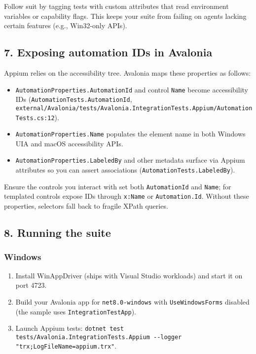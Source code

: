 Follow suit by tagging tests with custom attributes that read
environment variables or capability flags. This keeps your suite from
failing on agents lacking certain features (e.g., Win32-only APIs).

\subsection{7. Exposing automation IDs in
Avalonia}\label{exposing-automation-ids-in-avalonia}

Appium relies on the accessibility tree. Avalonia maps these properties
as follows:

\begin{itemize}
\tightlist
\item
  \passthrough{\lstinline!AutomationProperties.AutomationId!} and
  control \passthrough{\lstinline!Name!} become accessibility IDs
  (\passthrough{\lstinline!AutomationTests.AutomationId!},
  \passthrough{\lstinline!external/Avalonia/tests/Avalonia.IntegrationTests.Appium/AutomationTests.cs:12!}).
\item
  \passthrough{\lstinline!AutomationProperties.Name!} populates the
  element name in both Windows UIA and macOS accessibility APIs.
\item
  \passthrough{\lstinline!AutomationProperties.LabeledBy!} and other
  metadata surface via Appium attributes so you can assert associations
  (\passthrough{\lstinline!AutomationTests.LabeledBy!}).
\end{itemize}

Ensure the controls you interact with set both
\passthrough{\lstinline!AutomationId!} and
\passthrough{\lstinline!Name!}; for templated controls expose IDs
through \passthrough{\lstinline!x:Name!} or
\passthrough{\lstinline!Automation.Id!}. Without these properties,
selectors fall back to fragile XPath queries.

\subsection{8. Running the suite}\label{running-the-suite}

\subsubsection{Windows}\label{windows-3}

\begin{enumerate}
\def\labelenumi{\arabic{enumi}.}
\tightlist
\item
  Install WinAppDriver (ships with Visual Studio workloads) and start it
  on port 4723.
\item
  Build your Avalonia app for \passthrough{\lstinline!net8.0-windows!}
  with \passthrough{\lstinline!UseWindowsForms!} disabled (the sample
  uses \passthrough{\lstinline!IntegrationTestApp!}).
\item
  Launch Appium tests:
  \passthrough{\lstinline!dotnet test tests/Avalonia.IntegrationTests.Appium --logger "trx;LogFileName=appium.trx"!}.
\end{enumerate}

